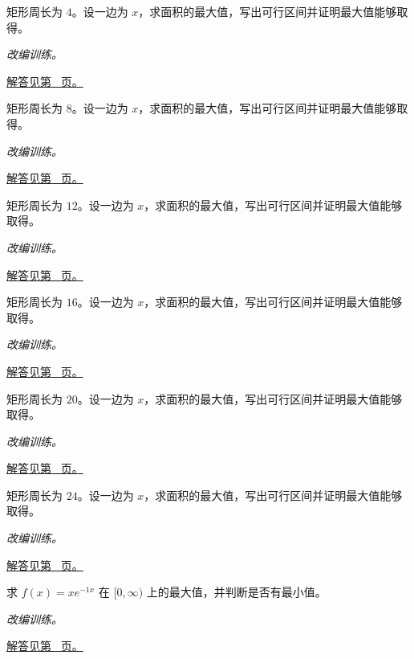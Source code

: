 \documentclass[UTF8,12pt,a4paper,fontset=fandol]{ctexart}
\begin{document}
\begin{example}[固定周长矩形的最大面积]\label{ex:c11q8}
矩形周长为 $4$。设一边为 $x$，求面积的最大值，写出可行区间并证明最大值能够取得。
\par\textit{改编训练。}\par\hyperref[ans:c11q8]{解答见第~\pageref{ans:c11q8} 页。}
\end{example}
\begin{example}[固定周长矩形的最大面积]\label{ex:c11q9}
矩形周长为 $8$。设一边为 $x$，求面积的最大值，写出可行区间并证明最大值能够取得。
\par\textit{改编训练。}\par\hyperref[ans:c11q9]{解答见第~\pageref{ans:c11q9} 页。}
\end{example}
\begin{example}[固定周长矩形的最大面积]\label{ex:c11q10}
矩形周长为 $12$。设一边为 $x$，求面积的最大值，写出可行区间并证明最大值能够取得。
\par\textit{改编训练。}\par\hyperref[ans:c11q10]{解答见第~\pageref{ans:c11q10} 页。}
\end{example}
\begin{example}[固定周长矩形的最大面积]\label{ex:c11q11}
矩形周长为 $16$。设一边为 $x$，求面积的最大值，写出可行区间并证明最大值能够取得。
\par\textit{改编训练。}\par\hyperref[ans:c11q11]{解答见第~\pageref{ans:c11q11} 页。}
\end{example}
\begin{example}[固定周长矩形的最大面积]\label{ex:c11q12}
矩形周长为 $20$。设一边为 $x$，求面积的最大值，写出可行区间并证明最大值能够取得。
\par\textit{改编训练。}\par\hyperref[ans:c11q12]{解答见第~\pageref{ans:c11q12} 页。}
\end{example}
\begin{example}[固定周长矩形的最大面积]\label{ex:c11q13}
矩形周长为 $24$。设一边为 $x$，求面积的最大值，写出可行区间并证明最大值能够取得。
\par\textit{改编训练。}\par\hyperref[ans:c11q13]{解答见第~\pageref{ans:c11q13} 页。}
\end{example}
\begin{example}[指数衰减与内点最大值]\label{ex:c11q14}
求 $f(x)=xe^{-1x}$ 在 $[0,\infty)$ 上的最大值，并判断是否有最小值。
\par\textit{改编训练。}\par\hyperref[ans:c11q14]{解答见第~\pageref{ans:c11q14} 页。}
\end{example}
\end{document}
